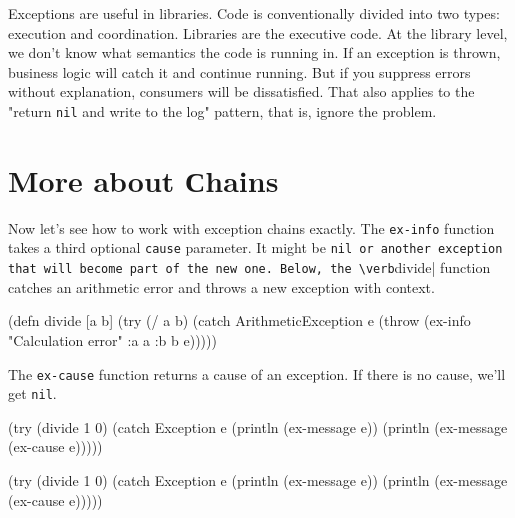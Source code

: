 \fi

Exceptions are useful in libraries. Code is conventionally divided into two types: execution and coordination. Libraries are the executive code. At the library level, we don't know what semantics the code is running in. If an exception is thrown, business logic will catch it and continue running. But if you suppress errors without explanation, consumers will be dissatisfied. That also applies to the "return \verb|nil| and write to the log" pattern, that is, ignore the problem.

\section{More about Сhains}


Now let's see how to work with exception chains exactly. The \verb|ex-info| function takes a third optional \verb|cause| parameter. It might be \verb|nil or another exception that will become part of the new one. Below, the \verb|divide| function catches an arithmetic error and throws a new exception with context.


\label{re-throw-example}

\begin{english}
  \begin{clojure}
(defn divide [a b]
  (try
    (/ a b)
    (catch ArithmeticException e
      (throw (ex-info
               "Calculation error"
               {:a a :b b}
               e)))))
  \end{clojure}
\end{english}

The \verb|ex-cause| function returns a cause of an exception. If there is no cause, we'll get \verb|nil|.

\ifx\DEVICETYPE\MOBILE

\begin{english}
  \begin{clojure}
(try
  (divide 1 0)
  (catch Exception e
    (println (ex-message e))
    (println (ex-message
               (ex-cause e)))))
  \end{clojure}
\end{english}

\else

\begin{english}
  \begin{clojure}
(try
  (divide 1 0)
  (catch Exception e
    (println (ex-message e))
    (println (ex-message (ex-cause e)))))
  \end{clojure}
\end{english}

